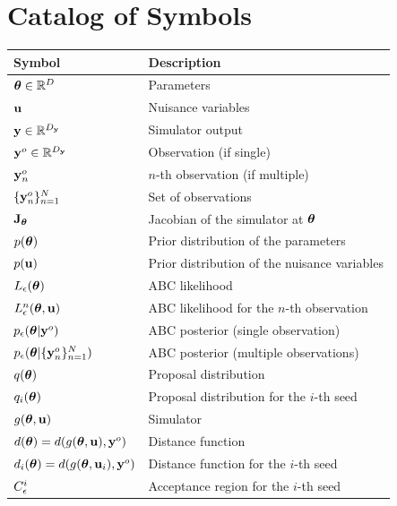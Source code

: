 \section{Catalog of Symbols}
\label{app-sec:symbols}

\begin{table}[!ht]
  \centering
  \begin{tabular}{ll}
    \toprule
    Symbol & Description \\
    \midrule
    $\boldsymbol{\theta} \in \mathbb{R}^D$ & Parameters \\
    $\mathbf{u}$ & Nuisance variables \\
    $\mathbf{y} \in \mathbb{R}^{D_{\mathbf{y}}}$ & Simulator output \\
    $\mathbf{y}^o \in \mathbb{R}^{D_{\mathbf{y}}}$ & Observation (if single) \\
    $\mathbf{y}^o_n$ & $n$-th observation (if multiple) \\
    $ \{ \mathbf{y}^o_n \}_{n=1}^N$ & Set of observations \\
    $\mathbf{J}_{\boldsymbol{\theta}}$ & Jacobian of the simulator at $\boldsymbol{\theta}$ \\
    \midrule
    $p(\boldsymbol{\theta})$ & Prior distribution of the parameters \\
    $p(\mathbf{u})$ & Prior distribution of the nuisance variables \\
    $L_{\epsilon}(\boldsymbol{\theta})$ & ABC likelihood \\
    $L_{\epsilon}^n(\boldsymbol{\theta}, \mathbf{u})$ & ABC likelihood for the $n$-th observation \\
    $p_{\epsilon}(\boldsymbol{\theta} | \mathbf{y}^o)$ & ABC posterior (single observation) \\
    $p_{\epsilon}(\boldsymbol{\theta} | \{ \mathbf{y}^o_n \}_{n=1}^N)$ & ABC posterior (multiple observations) \\
    $q(\boldsymbol{\theta})$ & Proposal distribution \\
    $q_i(\boldsymbol{\theta})$ & Proposal distribution for the $i$-th seed \\
    \midrule
    $g(\boldsymbol{\theta}, \mathbf{u})$ & Simulator \\
    $d(\boldsymbol{\theta}) = d(g(\boldsymbol{\theta}, \mathbf{u}), \mathbf{y}^o)$ & Distance function \\
    $d_i(\boldsymbol{\theta}) = d(g(\boldsymbol{\theta}, \mathbf{u}_i), \mathbf{y}^o)$ & Distance function for the $i$-th seed \\
    \midrule
    $C_{\epsilon}^i$ & Acceptance region for the $i$-th seed \\

\end{tabular}
\end{table}
